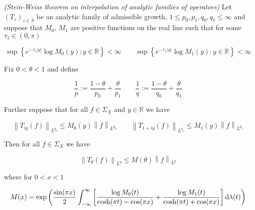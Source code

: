 \vspace{2mm}

\begin{mdframed}
	\begin{theorem}\emph{(Stein-Weiss theorem on interpolation of analytic families of operators)}
		Let $\left( T_z \right)_{z \in \overline{S}}$ be an analytic family of admissible growth, $1 \leqslant p_0,p_1,q_0,q_1 \leqslant \infty$ and suppose that $M_0$, $M_1$ are positive functions on the real line such that for some $\tau_1 \in (0,\pi)$

			\begin{equation}
				\sup\left\{e^{-\tau_1 \vert y \vert} \log M_0(y) : y \in \mathbb{R}\right\} < \infty \qquad \sup\left\{e^{-\tau_1 \vert y \vert} \log M_1(y) : y \in \mathbb{R}\right\} < \infty
			\end{equation}

			Fix $0 < \theta < 1$ and define

			\begin{equation}
				\frac{1}{p} := \frac{1 - \theta}{p_0} + \frac{\theta}{p_1} \qquad \frac{1}{q} := \frac{1 - \theta}{q_0} + \frac{\theta}{q_1}
			\end{equation}

			Further suppose that for all $f \in \Sigma_X$ and $y \in \mathbb{R}$ we have

			\begin{equation}
				\left\|T_{iy}(f)\right\|_{L^{q_0}} \leqslant M_0(y)\left\|f\right\|_{L^{p_0}} \qquad \left\|T_{1 + iy}(f)\right\|_{L^{q_1}} \leqslant M_1(y)\left\|f\right\|_{L^{p_1}} 
			\end{equation}

			Then for all $f \in \Sigma_X$ we have

			\begin{equation*}
				\left\|T_\theta(f)\right\|_{L^q} \leqslant M(\theta)\left\|f\right\|_{L^p}
			\end{equation*}

			where for $0 < x < 1$

			\begin{equation*}
				M(x) = \exp\left( \frac{\sin(\pi x)}{2} \int_{-\infty}^\infty \left[ \frac{\log M_0(t)}{\cosh(\pi t) - \cos(\pi x)} + \frac{\log M_1(t)}{\cosh(\pi t) + \cos(\pi x)}\right] \mathop{}\!\mathrm{d}\lambda(t) \right)
			\end{equation*}
	\end{theorem}
\end{mdframed}

\vspace{2mm}

